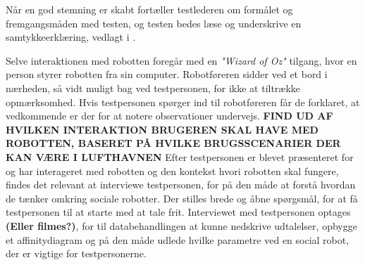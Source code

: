 Når en god stemning er skabt fortæller testlederen om formålet og fremgangsmåden med testen, og testen bedes læse og underskrive en samtykkeerklæring, vedlagt i .\blankline
%

Selve interaktionen med robotten foregår med en \textit{"Wizard of Oz"} tilgang, hvor en person styrer robotten fra sin computer. Robotføreren sidder ved et bord i nærheden, så vidt muligt bag ved testpersonen, for ikke at tiltrække opmærksomhed. Hvis testpersonen spørger ind til robotføreren får de forklaret, at vedkommende er der for at notere observationer undervejs. 
\textbf{FIND UD AF HVILKEN INTERAKTION BRUGEREN SKAL HAVE MED ROBOTTEN, BASERET PÅ HVILKE BRUGSSCENARIER DER KAN VÆRE I LUFTHAVNEN} \blankline
%
Efter testpersonen er blevet præsenteret for og har interageret med robotten og den kontekst hvori robotten skal fungere, findes det relevant at interviewe testpersonen, for på den måde at forstå hvordan de tænker omkring sociale robotter. Der stilles brede og åbne spørgsmål, for at få testpersonen til at starte med at tale frit. Interviewet med testpersonen optages \textbf{(Eller filmes?)}, for til databehandlingen at kunne nedskrive udtalelser, opbygge et affinitydiagram og på den måde udlede hvilke parametre ved en social robot, der er vigtige for testpersonerne.
